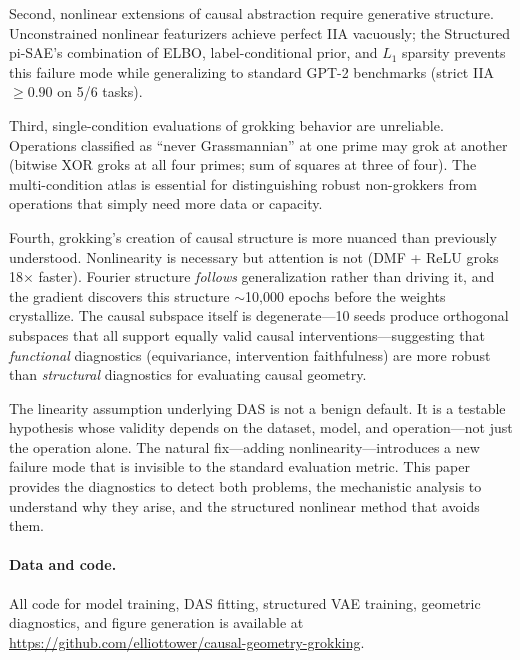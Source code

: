 \documentclass{article}
\begin{document}
Second, nonlinear extensions of causal abstraction require generative
structure. Unconstrained nonlinear featurizers achieve perfect IIA vacuously;
the Structured pi-SAE's combination of ELBO, label-conditional prior, and
$L_1$ sparsity prevents this failure mode while generalizing to standard
GPT-2 benchmarks (strict IIA $\geq 0.90$ on 5/6 tasks).

Third, single-condition evaluations of grokking behavior are unreliable.
Operations classified as ``never Grassmannian'' at one prime may grok at
another (bitwise XOR groks at all four primes; sum of squares at three of
four). The multi-condition atlas is essential for distinguishing robust
non-grokkers from operations that simply need more data or capacity.

Fourth, grokking's creation of causal structure is more nuanced than
previously understood. Nonlinearity is necessary but attention is not (DMF +
ReLU groks 18$\times$ faster). Fourier structure \emph{follows}
generalization rather than driving it, and the gradient discovers this
structure $\sim$10{,}000 epochs before the weights crystallize. The causal
subspace itself is degenerate---10 seeds produce orthogonal subspaces that
all support equally valid causal interventions---suggesting that
\emph{functional} diagnostics (equivariance, intervention faithfulness) are
more robust than \emph{structural} diagnostics for evaluating causal
geometry.

The linearity assumption underlying DAS is not a benign default. It is a
testable hypothesis whose validity depends on the dataset, model, and
operation---not just the operation alone. The natural fix---adding
nonlinearity---introduces a new failure mode that is invisible to the
standard evaluation metric. This paper provides the diagnostics to detect
both problems, the mechanistic analysis to understand why they arise, and the
structured nonlinear method that avoids them.

\paragraph{Data and code.} All code for model training, DAS fitting, structured
VAE training, geometric diagnostics, and figure generation is available at
\url{https://github.com/elliottower/causal-geometry-grokking}.

%
%




\clearpage
\appendix

\end{document}
